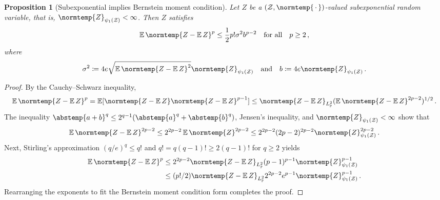 \documentclass{article}
\theoremstyle{plain}
\newtheorem{proposition}[theorem]{Proposition}
\theoremstyle{my_def}
\theoremstyle{my_rem}
\numberwithin{equation}{section}
\numberwithin{theorem}{section}%
\newcommand{\E}{\mathbb{E}}
\renewcommand{\P}{\mathbb{P}}
\newcommand{\cZ}{\mathcal{Z}}
\newcommand{\norm}{\normtemp}
\newcommand{\abs}{\abstemp}
\newcommand{\slot}{{\,\cdot\,}}
\newcommand{\defeq}{\coloneqq} %
\renewcommand{\E}{\operatorname{\mathbb{E}}} %
\def\qa{\quad\text{and}\quad}
\begin{document}
\begin{proposition}[Subexponential implies Bernstein moment condition]\label{prop:app_subexp_bern_mom}
    Let $Z$ be a $(\cZ,\norm{\slot})$-valued subexponential random variable, that is, $\norm{Z}_{\psi_1(\cZ)}<\infty$. Then $Z$ satisfies
    \begin{equation}
        \E\norm{Z-\E Z}^p\leq \frac{1}{2}p!\sigma^2 b^{p-2} \quad\text{for all}\quad p\geq 2\,,
    \end{equation}
    where
    \begin{equation}\label{eq:prop_app_subexp_bern_mom}
        \sigma^2 \defeq 4e\sqrt{\E\norm{Z-\E Z}^2}\norm{Z}_{\psi_1(\cZ)}\qa b\defeq 4e\norm{Z}_{\psi_1(\cZ)}\,.
    \end{equation}
\end{proposition}
\begin{proof}
    By the Cauchy--Schwarz inequality,
    \begin{equation*}
          \E\norm{Z-\E Z}^p=\E[\norm{Z-\E Z}\norm{Z-\E Z}^{p-1}]
        \leq \norm{Z-\E Z}_{L^2_\P}(\E \norm{Z-\E Z}^{2p-2})^{1/2}\,.
    \end{equation*}
    The inequality $\abs{a+b}^q\leq 2^{q-1}(\abs{a}^q +\abs{b}^q)$, Jensen's inequality, and $\norm{Z}_{\psi_1(\cZ)}<\infty$ show that
    \begin{equation*}
        \E \norm{Z-\E Z}^{2p-2}\leq 2^{2p-2}\E\norm{Z}^{2p-2}\leq 2^{2p-2}(2p-2)^{2p-2}\norm{Z}_{\psi_1(\cZ)}^{2p-2}\,.
    \end{equation*}
    Next, Stirling's approximation $(q/e)^q\leq q!$ and $q!=q(q-1)!\geq 2(q-1)!$ for $q\geq 2$ yields
    \begin{align*}
        \E\norm{Z-\E Z}^p&\leq 2^{2p-2}\norm{Z-\E Z}_{L^2_\P}(p-1)^{p-1}\norm{Z}_{\psi_1(\cZ)}^{p-1}\\
        &\leq (p!/2)\norm{Z-\E Z}_{L^2_\P}2^{2p-2} e^{p-1} \norm{Z}_{\psi_1(\cZ)}^{p-1}\,.
    \end{align*}
    Rearranging the exponents to fit the Bernstein moment condition form completes the proof.
\end{proof}
\end{document}
